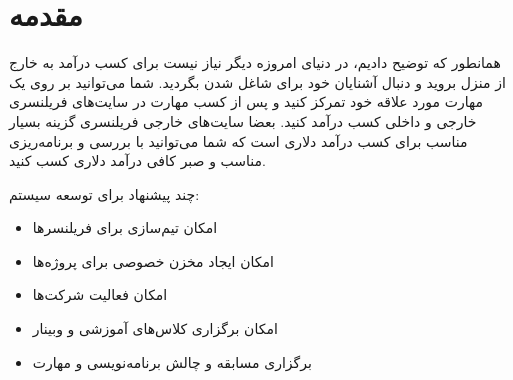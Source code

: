 
\section*{مقدمه}
همانطور که توضیح دادیم، در دنیای امروزه دیگر نیاز نیست برای کسب درآمد به خارج از منزل بروید و دنبال آشنایان خود برای شاغل شدن بگردید. شما می‌توانید بر روی یک مهارت  مورد علاقه خود تمرکز کنید و پس از کسب مهارت در سایت‌های فریلنسری خارجی و داخلی کسب درآمد کنید. بعضا سایت‌های خارجی فریلنسری گزینه بسیار مناسب برای کسب درآمد دلاری است که شما می‌توانید با بررسی و برنامه‌ریزی مناسب و صبر کافی درآمد دلاری کسب کنید.

چند پیشنهاد برای توسعه سیستم:
\begin{itemize}
	\item 
	امکان تیم‌سازی برای فریلنسرها
	\item 
	امکان ایجاد مخزن خصوصی برای پروژه‌ها
	\item 
	امکان فعالیت شرکت‌ها
	\item 
	امکان برگزاری کلاس‌های آموزشی و وبینار
	\item 
 	برگزاری مسابقه و چالش برنامه‌نویسی و مهارت‌
\end{itemize}
